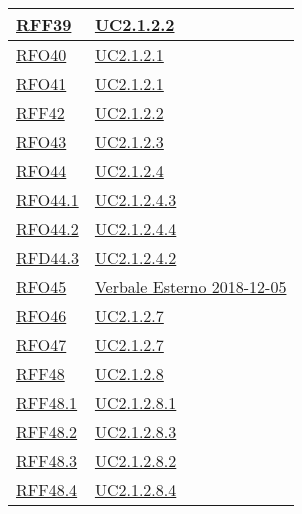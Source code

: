 \begin{longtable}{|>{\centering}m{5cm}|m{5cm}<{\centering}|}
	\hyperlink{RFF39}{RFF39} & \hyperref[UC2.1.2.2]{UC2.1.2.2}\\ \hline
	
	\hyperlink{RFO40}{RFO40} & \hyperref[UC2.1.2.1]{UC2.1.2.1}\\ \hline
	
	\hyperlink{RFO41}{RFO41} & \hyperref[UC2.1.2.1]{UC2.1.2.1}\\ \hline
	
	\hyperlink{RFF42}{RFF42} & \hyperref[UC2.1.2.2]{UC2.1.2.2}\\ \hline
	
	\hyperlink{RFO43}{RFO43} & \hyperref[UC2.1.2.3]{UC2.1.2.3}\\ \hline
	
	\hyperlink{RFO44}{RFO44} & \hyperref[UC2.1.2.4]{UC2.1.2.4}\\ \hline
	
	\hyperlink{RFO44.1}{RFO44.1} & \hyperref[UC2.1.2.4.3]{UC2.1.2.4.3}\\ \hline
	
	\hyperlink{RFO44.2}{RFO44.2} & \hyperref[UC2.1.2.4.4]{UC2.1.2.4.4}\\ \hline
	
	\hyperlink{RFD44.3}{RFD44.3} & \hyperref[UC2.1.2.4.2]{UC2.1.2.4.2}\\ \hline
	
	\hyperlink{RFO45}{RFO45} & \hyperref[Verbale Esterno 2018-12-05]{Verbale Esterno 2018-12-05}\\ \hline
	
	\hyperlink{RFO46}{RFO46} & \hyperref[UC2.1.2.7]{UC2.1.2.7}\\ \hline
	
	\hyperlink{RFO47}{RFO47} & \hyperref[UC2.1.2.7]{UC2.1.2.7}\\ \hline
	
	\hyperlink{RFF48}{RFF48} & \hyperref[UC2.1.2.8]{UC2.1.2.8}\\ \hline
	
	\hyperlink{RFF48.1}{RFF48.1} & \hyperref[UC2.1.2.8.1]{UC2.1.2.8.1}\\ \hline
	
	\hyperlink{RFF48.2}{RFF48.2} & \hyperref[UC2.1.2.8.3]{UC2.1.2.8.3}\\ \hline
	
	\hyperlink{RFF48.3}{RFF48.3} & \hyperref[UC2.1.2.8.2]{UC2.1.2.8.2}\\ \hline
	
	\hyperlink{RFF48.4}{RFF48.4} & \hyperref[UC2.1.2.8.4]{UC2.1.2.8.4}\\ \hline
	

\end{longtable}

